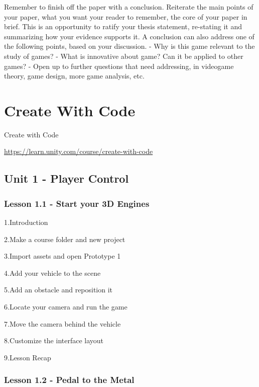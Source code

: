 \documentclass[
]{book}
\begin{document}
Remember to finish off the paper with a conclusion. Reiterate the main points of
your paper, what you want your reader to remember, the core of your paper in
brief. This is an opportunity to ratify your thesis statement, re-stating it and
summarizing how your evidence supports it. A conclusion can also address one of
the following points, based on your discussion.
- Why is this game relevant to the study of games?
- What is innovative about game? Can it be applied to other games?
- Open up to further questions that need addressing, in videogame theory, game
design, more game analysis, etc.

\hypertarget{create-with-code}{%
\chapter{Create With Code}\label{create-with-code}}

Create with Code

\url{https://learn.unity.com/course/create-with-code}

\hypertarget{unit-1---player-control}{%
\section{Unit 1 - Player Control}\label{unit-1---player-control}}

\hypertarget{lesson-1.1---start-your-3d-engines}{%
\subsection{Lesson 1.1 - Start your 3D Engines}\label{lesson-1.1---start-your-3d-engines}}

1.Introduction

2.Make a course folder and new project

3.Import assets and open Prototype 1

4.Add your vehicle to the scene

5.Add an obstacle and reposition it

6.Locate your camera and run the game

7.Move the camera behind the vehicle

8.Customize the interface layout

9.Lesson Recap

\hypertarget{lesson-1.2---pedal-to-the-metal}{%
\subsection{Lesson 1.2 - Pedal to the Metal}\label{lesson-1.2---pedal-to-the-metal}}
\end{document}
